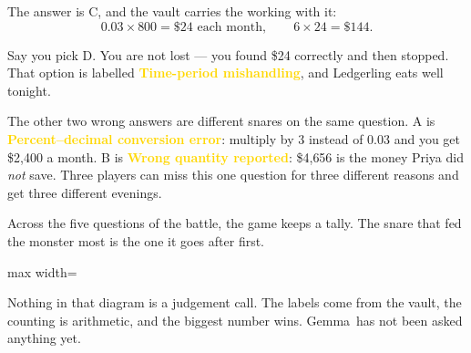 \documentclass[11pt]{article}
\newcommand{\themodel}{Gemma}
\newcommand{\snare}[1]{\textcolor{Gold}{\textbf{#1}}}
\begin{document}
The answer is C, and the vault carries the working with it:
\[
  0.03 \times 800 = \$24 \text{ each month},\qquad 6 \times 24 = \$144 .
\]

Say you pick D. You are not lost --- you found \$24 correctly and then stopped.
That option is labelled \snare{Time-period mishandling}, and Ledgerling eats
well tonight.

The other two wrong answers are different snares on the same question. A is
\snare{Percent--decimal conversion error}: multiply by 3 instead of 0.03 and
you get \$2{,}400 a month. B is \snare{Wrong quantity reported}: \$4{,}656 is
the money Priya did \emph{not} save. Three players can miss this one question
for three different reasons and get three different evenings.

Across the five questions of the battle, the game keeps a tally. The snare that
fed the monster most is the one it goes after first.

\vspace{0.5em}
\begin{center}
\begin{adjustbox}{max width=\textwidth}
\end{adjustbox}
\end{center}

Nothing in that diagram is a judgement call. The labels come from the vault,
the counting is arithmetic, and the biggest number wins. \themodel\ has not
been asked anything yet.

\end{document}
